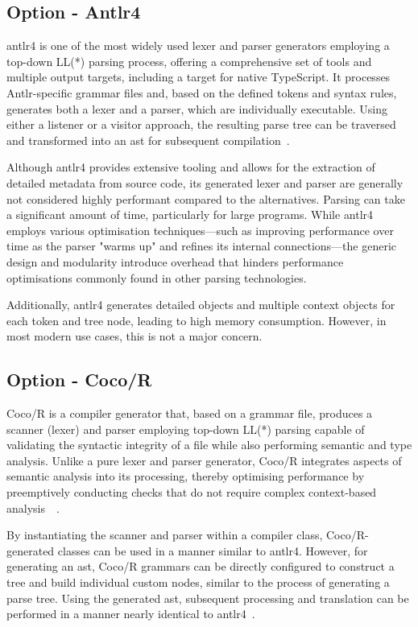 \subsection{Option - Antlr4}
\label{sec:parser-technology-option-antlr4}

\Gls{antlr4} is one of the most widely used lexer and parser generators employing a top-down LL(*) parsing process, offering a comprehensive set of tools and multiple output targets, including a target for native TypeScript. It processes Antlr-specific grammar files and, based on the defined tokens and syntax rules, generates both a lexer and a parser, which are individually executable. Using either a listener or a visitor approach, the resulting parse tree can be traversed and transformed into an \acrshort{ast} for subsequent compilation~\cite{antlr}.

Although \Gls{antlr4} provides extensive tooling and allows for the extraction of detailed metadata from source code, its generated lexer and parser are generally not considered highly performant compared to the alternatives. Parsing can take a significant amount of time, particularly for large programs. While \Gls{antlr4} employs various optimisation techniques—such as improving performance over time as the parser "warms up" and refines its internal connections—the generic design and modularity introduce overhead that hinders performance optimisations commonly found in other parsing technologies.

Additionally, \Gls{antlr4} generates detailed objects and multiple context objects for each token and tree node, leading to high memory consumption. However, in most modern use cases, this is not a major concern.

\subsection{Option - Coco/R}
\label{sec:parser-technology-option-coco}

Coco/R is a compiler generator that, based on a grammar file, produces a scanner (lexer) and parser employing top-down LL(*) parsing capable of validating the syntactic integrity of a file while also performing semantic and type analysis. Unlike a pure lexer and parser generator, Coco/R integrates aspects of semantic analysis into its processing, thereby optimising performance by preemptively conducting checks that do not require complex context-based analysis~\cite{coco}~\cite{coco-manual}.

By instantiating the scanner and parser within a compiler class, Coco/R-generated classes can be used in a manner similar to \Gls{antlr4}. However, for generating an \acrshort{ast}, Coco/R grammars can be directly configured to construct a tree and build individual custom nodes, similar to the process of generating a parse tree. Using the generated \acrshort{ast}, subsequent processing and translation can be performed in a manner nearly identical to \Gls{antlr4}~\cite{coco-ast}.

